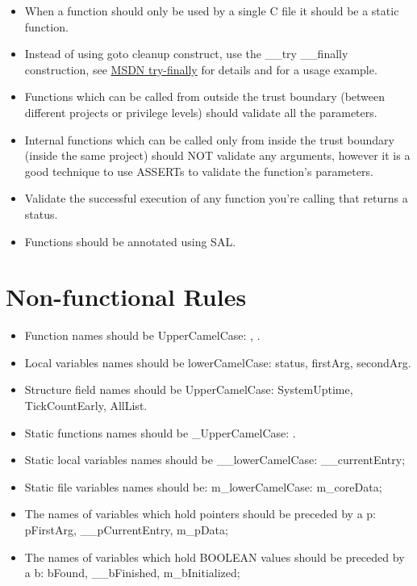 \begin{appendices}
\begin{itemize}
	\item When a function should only be used by a single C file it should be a static function.

	\item Instead of using goto cleanup construct, use the \_\_try \_\_finally construction, see
\href{https://msdn.microsoft.com/en-us/library/9xtt5hxz.aspx}{MSDN try-finally} for details and
 for a usage example.

	\item Functions which can be called from outside the trust boundary (between different projects
or privilege levels) should validate all the parameters.

	\item Internal functions which can be called only from inside the trust boundary (inside the
same project) should NOT validate any arguments, however it is a good technique to use ASSERTs to
validate the function's parameters.

	\item Validate the successful execution of any function you're calling that returns a status.

	\item Functions should be annotated using SAL.
\end{itemize}

\section{Non-functional Rules}
\begin{itemize}
	\item Function names should be UpperCamelCase: , .
	\item Local variables names should be lowerCamelCase: status, firstArg, secondArg.
	\item Structure field names should be UpperCamelCase: SystemUptime, TickCountEarly, AllList.

	\item Static functions names should be \_UpperCamelCase: .
	\item Static local variables names should be \_\_lowerCamelCase: \_\_currentEntry;
	\item Static file variables names should be: m\_lowerCamelCase: m\_coreData;

	\item The names of variables which hold pointers should be preceded by a p: pFirstArg,
\_\_pCurrentEntry, m\_pData;
	\item The names of variables which hold BOOLEAN values should be preceded by a b: bFound,
\_\_bFinished, m\_bInitialized;


\end{itemize}
\end{appendices}
